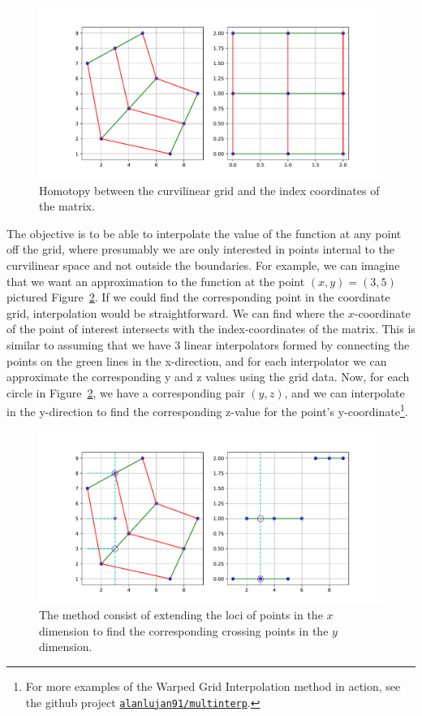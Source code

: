 \documentclass{article}
\begin{document}
\begin{figure}[!htbp]
\centering
\includegraphics[width=0.7\linewidth]{files/Homotopy-c486ccae2d8c26d26e99f9bd6dcd8a70.pdf}
\caption[]{Homotopy between the curvilinear grid and the index coordinates of the matrix.}
\label{fig:homotopy}
\end{figure}

The objective is to be able to interpolate the value of the function at any point off the grid, where presumably we are only interested in points internal to the curvilinear space and not outside the boundaries. For example, we can imagine that we want an approximation to the function at the point $(x,y) = (3, 5)$ pictured Figure~\ref{fig:mapping}. If we could find the corresponding point in the coordinate grid, interpolation would be straightforward. We can find where the $x$-coordinate of the point of interest intersects with the index-coordinates of the matrix. This is similar to assuming that we have 3 linear interpolators formed by connecting the points on the green lines in the x-direction, and for each interpolator we can approximate the corresponding y and z values using the grid data. Now, for each circle in Figure~\ref{fig:mapping}, we have a corresponding pair $(y,z)$, and we can interpolate in the y-direction to find the corresponding z-value for the point's y-coordinate\footnote{For more examples of the Warped Grid Interpolation method in action, see the github project \href{https://github.com/alanlujan91/multinterp/blob/main/notebooks/CurvilinearInterpolation.ipynb}{\texttt{alanlujan91/multinterp}}.}.

\begin{figure}[!htbp]
\centering
\includegraphics[width=0.7\linewidth]{files/Mapping-5060b76836fbab4ad024c4601f429092.pdf}
\caption[]{The method consist of extending the loci of points in the $x$ dimension to find the corresponding crossing points in the $y$ dimension.}
\label{fig:mapping}
\end{figure}
\end{document}
